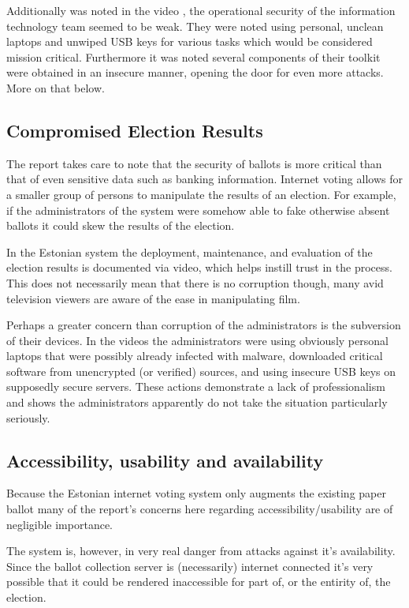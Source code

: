\documentclass[a4paper, 11pt]{article} %
\begin{document}
Additionally was noted in the video \cite{halderman-estonia-presentation}, the operational security of the information technology team seemed to be weak. They were noted using personal, unclean laptops and unwiped USB keys for various tasks which would be considered mission critical. Furthermore it was noted several components of their toolkit were obtained in an insecure manner, opening the door for even more attacks. More on that below.

\subsection*{Compromised Election Results}

The report takes care to note that the security of ballots is more critical than that of even sensitive data such as banking information. Internet voting allows for a smaller group of persons to manipulate the results of an election. For example, if the administrators of the system were somehow able to fake otherwise absent ballots it could skew the results of the election.

In the Estonian system the deployment, maintenance, and evaluation of the election results is documented via video, which helps instill trust in the process. This does not necessarily mean that there is no corruption though, many avid television viewers are aware of the ease in manipulating film.

Perhaps a greater concern than corruption of the administrators is the subversion of their devices. In the videos the administrators were using obviously personal laptops that were possibly already infected with malware, downloaded critical software from unencrypted (or verified) sources, and using insecure USB keys on supposedly secure servers. These actions demonstrate a lack of professionalism and shows the administrators apparently do not take the situation particularly seriously.

\subsection*{Accessibility, usability and availability}

Because the Estonian internet voting system only augments the existing paper ballot many of the report's concerns here regarding accessibility/usability are of negligible importance.

The system is, however, in very real danger from attacks against it's availability. Since the ballot collection server is (necessarily) internet connected it's very possible that it could be rendered inaccessible for part of, or the entirity of, the election.
\end{document}
